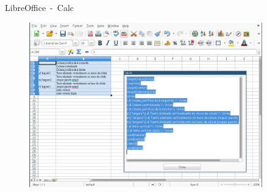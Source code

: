 \begin{frame}{LibreOffice~-~Calc}
\begin{figure}[htbp!]
	\centering
	\includegraphics[width=0.9\textwidth]{figuras/calc2.png}
	\caption{ }
	\label{fig:tableOnline}
\end{figure}
\end{frame}